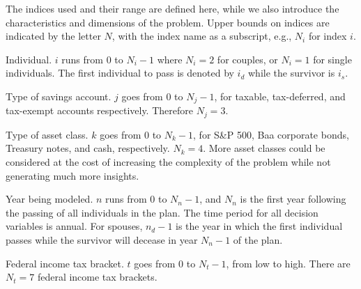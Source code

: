 \documentclass{article}[fleqn,12pt]
\begin{document}
The indices used and their range are defined here, while we also
introduce the characteristics and dimensions of the problem.
Upper bounds on indices are indicated by the letter $N$, with the
index name as a subscript, e.g., $N_i$ for index $i$.
\begin{description}[leftmargin=4em,style=multiline]
\item [$i$]
	Individual. $i$ runs from 0 to $N_i - 1$ where $N_i = 2$ for couples,
	or $N_i= 1$ for single individuals. The first individual to pass
		is denoted by $i_d$ while the survivor is $i_s$.
\item [$j$]
	Type of savings account. $j$ goes from 0 to $N_j - 1$, for taxable, tax-deferred,
	and tax-exempt accounts respectively. Therefore $N_j = 3$.
\item[$k$]
	Type of asset class. $k$ goes from 0 to $N_k -1 $, for S\&P 500,
	Baa corporate bonds, Treasury notes, and cash, respectively. $N_k = 4$.
	More asset classes could be considered at the cost of increasing
	the complexity of the problem while not generating much more insights.
\item [$n$]
	Year being modeled. $n$ runs from 0 to $N_n-1$, and $N_n$
	is the first year following the passing of all
	individuals in the plan. The time period for all decision variables is annual.
	For spouses, $n_d-1$ is the year in which the first individual passes while
	the survivor will decease in year $N_n-1$ of the plan.
\item [$t$]
	Federal income tax bracket. $t$ goes from 0 to $N_t - 1$, from low to high.
	There are $N_t = 7$ federal income tax brackets.
\end{description}
\end{document}
